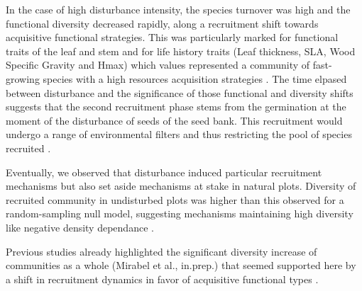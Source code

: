 \documentclass[fleqn,10pt]{ArtEcoFoG} %
\begin{document}
In the case of high disturbance intensity, the species turnover was high
and the functional diversity decreased rapidly, along a recruitment
shift towards acquisitive functional strategies. This was particularly
marked for functional traits of the leaf and stem and for life history
traits (Leaf thickness, SLA, Wood Specific Gravity and Hmax) which
values represented a community of fast-growing species with a high
resources acquisition strategies
\citep{Wright2004, Chave2009b, Herault2011, Reich2014}. The time elpased
between disturbance and the significance of those functional and
diversity shifts suggests that the second recruitment phase stems from
the germination at the moment of the disturbance of seeds of the seed
bank. This recruitment would undergo a range of environmental filters
and thus restricting the pool of species recruited \citep{Molino2001}.

Eventually, we observed that disturbance induced particular recruitment
mechanisms but also set aside mechanisms at stake in natural plots.
Diversity of recruited community in undisturbed plots was higher than
this observed for a random-sampling null model, suggesting mechanisms
maintaining high diversity like negative density dependance
\citep{Harms2000}.

Previous studies already highlighted the significant diversity increase
of communities as a whole (Mirabel et al., in.prep.) that seemed
supported here by a shift in recruitment dynamics in favor of
acquisitive functional types \citep{TerSteege2001}.
\end{document}
